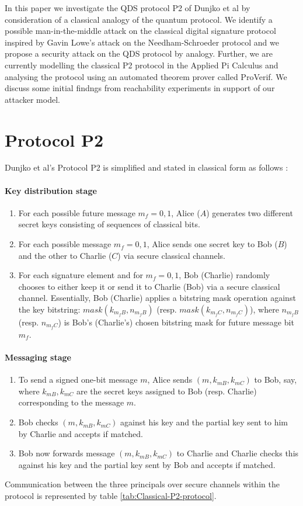 \documentclass[english]{article}
\begin{document}
In this paper we investigate the QDS protocol P2 of Dunjko et al by
consideration of a classical analogy of the quantum protocol. We identify
a possible man-in-the-middle attack on the classical digital signature
protocol inspired by Gavin Lowe's attack on the Needham-Schroeder
protocol \cite{Lowe1995} and we propose a security attack on the
QDS protocol by analogy. Further, we are currently modelling the classical
P2 protocol in the Applied Pi Calculus and analysing the protocol
using an automated theorem prover called ProVerif. We discuss some
initial findngs from reachability experiments in support of our attacker
model.


\section{Protocol P2}

Dunjko et al's Protocol P2 is simplified and stated in classical form
as follows \cite{Dunjko2014a}:


\paragraph{Key distribution stage}
\begin{enumerate}
\item For each possible future message $m_{f}=0,1$, Alice ($A$) generates
two different secret keys consisting of sequences of classical bits.
\item For each possible message $m_{f}=0,1$, Alice sends one secret key
to Bob ($B$) and the other to Charlie ($C$) via secure classical
channels.
\item For each signature element and for $m_{f}=0,1$, Bob (Charlie) randomly
chooses to either keep it or send it to Charlie (Bob) via a secure
classical channel. Essentially, Bob (Charlie) applies a bitstring
mask operation against the key bitstring: $mask\left(k{}_{m_{f}B},n_{m_{f}B}\right)$
(resp. $mask\left(k{}_{m_{f}C},n_{m_{f}C}\right)$), where $n_{m_{f}B}$
(resp. $n_{m_{f}C}$) is Bob's (Charlie's) chosen bitstring mask for
future message bit $m_{f}$.
\end{enumerate}

\paragraph*{Messaging stage}
\begin{enumerate}
\item To send a signed one-bit message $m$, Alice sends $\left(m,k_{mB},k_{mC}\right)$
to Bob, say, where $k_{mB},k_{mC}$ are the secret keys assigned to
Bob (resp. Charlie) corresponding to the message $m$.
\item Bob checks $\left(m,k_{mB},k_{mC}\right)$ against his key and the
partial key sent to him by Charlie and accepts if matched.
\item Bob now forwards message $\left(m,k_{mB},k_{mC}\right)$ to Charlie
and Charlie checks this against his key and the partial key sent by
Bob and accepts if matched.
\end{enumerate}
Communication between the three principals over secure channels within
the protocol is represented by table \ref{tab:Classical-P2-protocol}.
\end{document}
